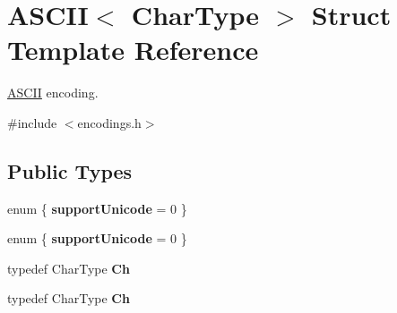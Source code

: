 \hypertarget{struct_a_s_c_i_i}{}\section{A\+S\+C\+II$<$ Char\+Type $>$ Struct Template Reference}
\label{struct_a_s_c_i_i}


\hyperlink{struct_a_s_c_i_i}{A\+S\+C\+II} encoding.  




{\ttfamily \#include $<$encodings.\+h$>$}

\subsection*{Public Types}
\begin{DoxyCompactItemize}
\item 
enum \{ {\bfseries support\+Unicode} = 0
 \}\hypertarget{struct_a_s_c_i_i_a2f2c796586b1f9b18c7ff5c452eba0a9}{}\label{struct_a_s_c_i_i_a2f2c796586b1f9b18c7ff5c452eba0a9}

\item 
enum \{ {\bfseries support\+Unicode} = 0
 \}\hypertarget{struct_a_s_c_i_i_ae23a3d18a1d026de62930980b5c910dc}{}\label{struct_a_s_c_i_i_ae23a3d18a1d026de62930980b5c910dc}

\item 
typedef Char\+Type {\bfseries Ch}\hypertarget{struct_a_s_c_i_i_a1baf6e7914f165be952c30db664cefb4}{}\label{struct_a_s_c_i_i_a1baf6e7914f165be952c30db664cefb4}

\item 
typedef Char\+Type {\bfseries Ch}\hypertarget{struct_a_s_c_i_i_a1baf6e7914f165be952c30db664cefb4}{}\label{struct_a_s_c_i_i_a1baf6e7914f165be952c30db664cefb4}

\end{DoxyCompactItemize}
